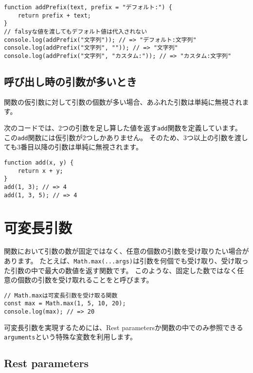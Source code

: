 \begin{lstlisting}
function addPrefix(text, prefix = "デフォルト:") {
    return prefix + text;
}
// falsyな値を渡してもデフォルト値は代入されない
console.log(addPrefix("文字列")); // => "デフォルト:文字列"
console.log(addPrefix("文字列", "")); // => "文字列"
console.log(addPrefix("文字列", "カスタム:")); // => "カスタム:文字列"
\end{lstlisting}

\hypertarget{function-more-arguments}{%
\subsection{呼び出し時の引数が多いとき}\label{function-more-arguments}}

関数の仮引数に対して引数の個数が多い場合、あふれた引数は単純に無視されます。

次のコードでは、2つの引数を足し算した値を返す\texttt{add}関数を定義しています。
この\texttt{add}関数には仮引数が2つしかありません。
そのため、3つ以上の引数を渡しても3番目以降の引数は単純に無視されます。

\begin{lstlisting}
function add(x, y) {
    return x + y;
}
add(1, 3); // => 4
add(1, 3, 5); // => 4
\end{lstlisting}

\hypertarget{variable-arguments}{%
\section{可変長引数}\label{variable-arguments}}

関数において引数の数が固定ではなく、任意の個数の引数を受け取りたい場合があります。
たとえば、\texttt{Math.max(...args)}は引数を何個でも受け取り、受け取った引数の中で最大の数値を返す関数です。
このような、固定した数ではなく任意の個数の引数を受け取れることを\textbf{}と呼びます。

\begin{lstlisting}
// Math.maxは可変長引数を受け取る関数
const max = Math.max(1, 5, 10, 20);
console.log(max); // => 20
\end{lstlisting}

可変長引数を実現するためには、Rest
parametersか関数の中でのみ参照できる\texttt{arguments}という特殊な変数を利用します。

\hypertarget{rest-parameters}{%
\subsection{Rest parameters\protect{}}\label{rest-parameters}}

